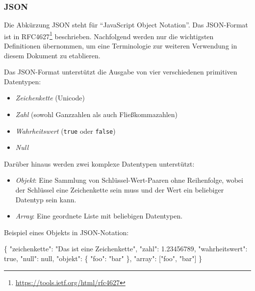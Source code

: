 \documentclass[,a4paper]{article}
\newenvironment{Shaded}{}{}
\newcommand{\DataTypeTok}[1]{\textcolor[rgb]{0.56,0.13,0.00}{{#1}}}
\newcommand{\DecValTok}[1]{\textcolor[rgb]{0.25,0.63,0.44}{{#1}}}
\newcommand{\FloatTok}[1]{\textcolor[rgb]{0.25,0.63,0.44}{{#1}}}
\newcommand{\StringTok}[1]{\textcolor[rgb]{0.25,0.44,0.63}{{#1}}}
\newcommand{\NormalTok}[1]{{#1}}
\begin{document}
\subsubsection{JSON}\label{json}

Die Abkürzung JSON steht für ``JavaScript Object Notation''. Das
JSON-Format ist in RFC4627\footnote{\url{https://tools.ietf.org/html/rfc4627}}
beschrieben. Nachfolgend werden nur die wichtigsten Definitionen
übernommen, um eine Terminologie zur weiteren Verwendung in diesem
Dokument zu etablieren.

Das JSON-Format unterstützt die Ausgabe von vier verschiedenen
primitiven Datentypen:

\begin{itemize}
\itemsep1pt\parskip0pt
\item
  \emph{Zeichenkette} (Unicode)
\item
  \emph{Zahl} (sowohl Ganzzahlen als auch Fließkommazahlen)
\item
  \emph{Wahrheitswert} (\texttt{true} oder \texttt{false})
\item
  \emph{Null}
\end{itemize}

Darüber hinaus werden zwei komplexe Datentypen unterstützt:

\begin{itemize}
\itemsep1pt\parskip0pt
\item
  \emph{Objekt}: Eine Sammlung von Schlüssel-Wert-Paaren ohne
  Reihenfolge, wobei der Schlüssel eine Zeichenkette sein muss und der
  Wert ein beliebiger Datentyp sein kann.
\item
  \emph{Array}: Eine geordnete Liste mit beliebigen Datentypen.
\end{itemize}

Beispiel eines Objekts in JSON-Notation:

\begin{Shaded}
\begin{Highlighting}[]
\NormalTok{\{}
    \DataTypeTok{"zeichenkette"}\NormalTok{: }\StringTok{"Das ist eine Zeichenkette"}\NormalTok{,}
    \DataTypeTok{"zahl"}\NormalTok{: }\FloatTok{1.23456789}\NormalTok{,}
    \DataTypeTok{"wahrheitswert"}\NormalTok{: }\DecValTok{true}\NormalTok{,}
    \DataTypeTok{"null"}\NormalTok{: }\DecValTok{null}\NormalTok{,}
    \DataTypeTok{"objekt"}\NormalTok{: \{}
        \DataTypeTok{"foo"}\NormalTok{: }\StringTok{"bar"}
    \NormalTok{\},}
    \DataTypeTok{"array"}\NormalTok{: [}\StringTok{"foo"}\NormalTok{, }\StringTok{"bar"}\NormalTok{]}
\NormalTok{\}}
\end{Highlighting}
\end{Shaded}
\end{document}
